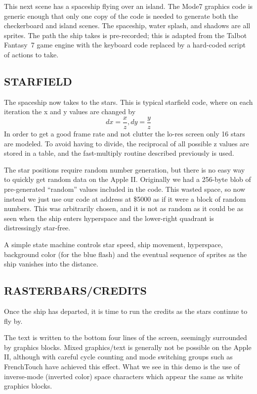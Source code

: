 \documentclass[twocolumn]{article}
\begin{document}
This next scene has a spaceship flying over an island.
The Mode7 graphics code is generic enough that only one copy of the code
is needed to generate both the checkerboard and island scenes.
The spaceship, water splash, and shadows are all sprites.
The path the ship takes is pre-recorded; this is adapted from the
Talbot Fantasy~7 game engine with the keyboard code replaced by a hard-coded
script of actions to take.

\subsection{STARFIELD}

The spaceship now takes to the stars.
This is typical starfield code, where on each iteration the x and y
values are changed by
	\[dx=\frac{x}{z}, dy=\frac{y}{z}\]
In order to get a good frame rate and not clutter the lo-res screen
only 16 stars are modeled.
To avoid having to divide, the reciprocal of all possible z values
are stored in a table, and the fast-multiply routine described
previously is used.

The star positions require random number generation, but there is no
easy way to quickly get random data on the Apple II.
Originally we had a 256-byte blob of pre-generated ``random'' values
included in the code.
This wasted space, so now instead we just use our code at address
at \$5000 as if it were a block of random numbers.
This was arbitrarily chosen, and it is not as random as it could be
as seen when the ship enters hyperspace and the lower-right quadrant
is distressingly star-free.

A simple state machine controls star speed, ship movement, hyperspace,
background color (for the blue flash) and the eventual sequence of sprites
as the ship vanishes into the distance.

\subsection{RASTERBARS/CREDITS}

Once the ship has departed, it is time to run the credits as the stars
continue to fly by.

The text is written to the bottom four lines of the screen, seemingly
surrounded by graphics blocks.
Mixed graphics/text is generally not be possible on the Apple II, although
with careful cycle counting and mode switching groups such as FrenchTouch
have achieved this effect.
What we see in this demo is the use of inverse-mode (inverted color)
space characters which appear the same as white graphics blocks.
\end{document}
